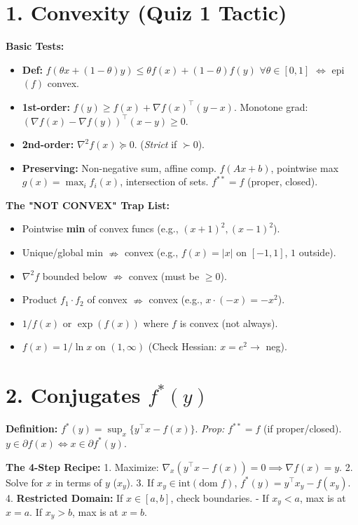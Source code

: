 \section*{1. Convexity (Quiz 1 Tactic)}
\textbf{Basic Tests:}
\begin{itemize}[leftmargin=*]
  \item \textbf{Def:} $f(\theta x + (1-\theta)y) \le \theta f(x) +
    (1-\theta)f(y)$ $\forall \theta \in [0,1]$ $\iff$ epi$(f)$ convex.
  \item \textbf{1st-order:} $f(y) \ge f(x) + \nabla f(x)^\top(y-x)$.
    Monotone grad: $(\nabla f(x)-\nabla f(y))^\top(x-y)\ge0$.
  \item \textbf{2nd-order:} $\nabla^2 f(x) \succeq 0$.
    (\textit{Strict} if $\succ 0$).
  \item \textbf{Preserving:} Non-negative sum, affine comp.
    $f(Ax+b)$, pointwise max $g(x)=\max_i f_i(x)$, intersection of
    sets. $f^{**}=f$ (proper, closed).
\end{itemize}

\textbf{The "NOT CONVEX" Trap List:}
\begin{itemize}[leftmargin=*]
  \item Pointwise \textbf{min} of convex funcs (e.g., $(x+1)^2, (x-1)^2$).
  \item Unique/global min $\nRightarrow$ convex (e.g., $f(x)=|x|$ on
    $[-1,1]$, $1$ outside).
  \item $\nabla^2 f$ bounded below $\nRightarrow$ convex (must be $\ge 0$).
  \item Product $f_1 \cdot f_2$ of convex $\nRightarrow$ convex
    (e.g., $x\cdot(-x)=-x^2$).
  \item $1/f(x)$ or $\exp(f(x))$ where $f$ is convex (not always).
  \item $f(x)=1/\ln x$ on $(1, \infty)$ (Check Hessian: $x=e^2 \to$ neg).
\end{itemize}

\section*{2. Conjugates $f^*(y)$}
\textbf{Definition:} $f^*(y) = \sup_{x} \{y^\top x - f(x)\}$.
\textit{Prop:} $f^{**}=f$ (if proper/closed). $y\in\partial f(x)\iff
x\in\partial f^*(y)$.

\textbf{The 4-Step Recipe:}
1. Maximize: $\nabla_x (y^\top x - f(x)) = 0 \implies \nabla f(x) = y$.
2. Solve for $x$ in terms of $y$ ($x_y$).
3. If $x_y \in \text{int}(\text{dom } f)$, $f^*(y) = y^\top x_y - f(x_y)$.
4. \textbf{Restricted Domain:} If $x \in [a, b]$, check boundaries.
- If $x_y < a$, max is at $x=a$. If $x_y > b$, max is at $x=b$.


